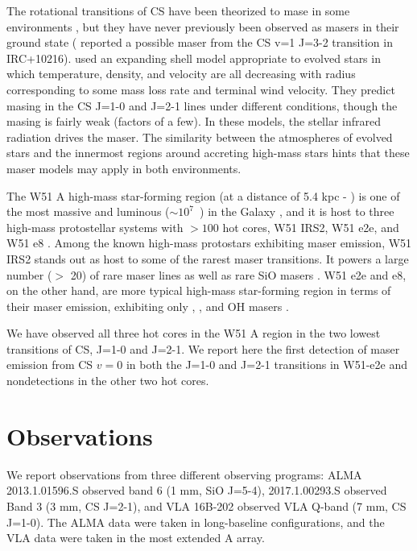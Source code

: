 \documentclass[twocolumn]{aastex62}
\begin{document}
The rotational transitions of CS have been theorized to mase
in some environments \citep{Schoenberg1988a}, but they have
never previously been observed as masers in their ground state
(\citealt{Highberger2000a} reported a possible maser from the CS v=1 J=3-2
transition in IRC+10216).
\citet{Schoenberg1988a}
used an expanding shell model appropriate to evolved stars in which
temperature, density, and velocity are all decreasing with radius corresponding
to some mass loss rate and terminal wind velocity. They predict masing in the
CS J=1-0 and J=2-1 lines under different conditions, though the masing is
fairly weak (factors of a few).  In these models, the stellar infrared
radiation drives the maser.  The similarity between the atmospheres
of evolved stars and the innermost regions around accreting high-mass stars
hints that these maser models may apply in both environments.


The W51 A high-mass star-forming region (at a distance of 5.4 kpc -
\citealt{Sato2010a}) is one of the most massive and luminous ($\sim10^7$~\lsun)
in the Galaxy \citep{Ginsburg2017b}, and it is host to three high-mass
protostellar systems with $>100$ \msun hot cores, W51 IRS2, W51 e2e, and W51 e8
\citep{Ginsburg2017a}.  Among the known high-mass protostars exhibiting maser
emission, W51 IRS2 stands out as host to some of the rarest maser transitions.
It powers a large number ($>$ 20) of rare \ammonia maser lines as well as rare
SiO masers \citep{Henkel2013a,Goddi2015a,Hasegawa1986a,Eisner2002a}.  W51 e2e and e8, on
the other hand, are more typical high-mass star-forming region in terms of
their maser emission, exhibiting only \methanol, \water, and OH masers
\citep{Goddi2016a}.

We have observed all three hot cores in the W51 A region in the two lowest
transitions of CS, J=1-0 and J=2-1.  We report here the first detection of
maser emission from CS $v=0$ in both the J=1-0 and J=2-1 transitions in
W51-e2e and nondetections in the other two hot cores.



\section{Observations}
\label{sec:observations}
We report observations from three different observing programs:
ALMA 2013.1.01596.S \citep{Goddi2018a} observed band 6 (1 mm, SiO J=5-4), 2017.1.00293.S
observed Band 3 (3 mm, CS J=2-1), and VLA 16B-202 observed VLA Q-band (7 mm, CS J=1-0).
The ALMA data were taken in long-baseline configurations, and the VLA data
were taken in the most extended A array.
\end{document}

